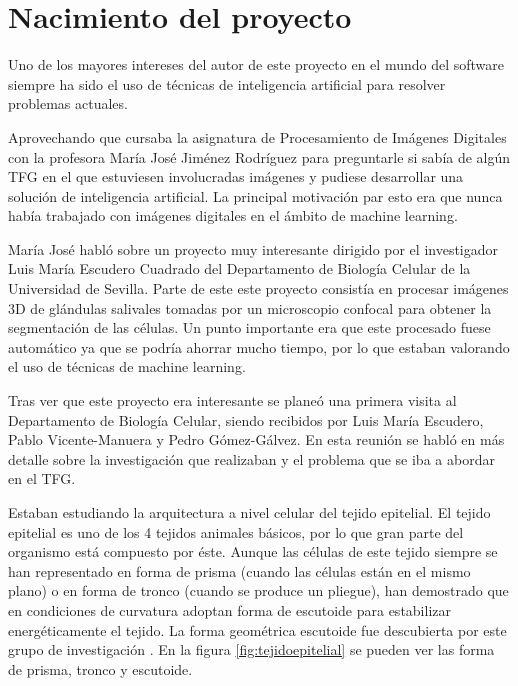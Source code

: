 \chapter{Nacimiento del proyecto}\label{nacimiento}

Uno de los mayores intereses del autor de este proyecto en el mundo del software siempre ha sido el uso de técnicas de inteligencia artificial para resolver problemas actuales.

Aprovechando que cursaba la asignatura de Procesamiento de Imágenes Digitales con la profesora María José Jiménez Rodríguez para preguntarle si sabía de algún TFG en el que estuviesen involucradas imágenes y pudiese desarrollar una solución de inteligencia artificial. La principal motivación par esto era que nunca había trabajado con imágenes digitales en el ámbito de machine learning.

María José habló sobre un proyecto muy interesante dirigido por el investigador Luis María Escudero Cuadrado del Departamento de Biología Celular de la Universidad de Sevilla. Parte de este este proyecto consistía en procesar imágenes 3D de glándulas salivales tomadas por un microscopio confocal para obtener la segmentación de las células. Un punto importante era que este procesado fuese automático ya que se podría ahorrar mucho tiempo, por lo que estaban valorando el uso de técnicas de machine learning.

Tras ver que este proyecto era interesante se planeó una primera visita al Departamento de Biología Celular, siendo recibidos por Luis María Escudero, Pablo Vicente-Manuera y Pedro Gómez-Gálvez. En esta reunión se habló en más detalle sobre la investigación que realizaban y el problema que se iba a abordar en el TFG.

Estaban estudiando la arquitectura a nivel celular del tejido epitelial. El tejido epitelial es uno de los 4 tejidos animales básicos, por lo que gran parte del organismo está compuesto por éste. Aunque las células de este tejido siempre se han representado en forma de prisma (cuando las células están en el mismo plano) o en forma de tronco (cuando se produce un pliegue), han demostrado que en condiciones de curvatura adoptan forma de escutoide para estabilizar energéticamente el tejido. La forma geométrica escutoide fue descubierta por este grupo de investigación \cite{GomezGalvez2018}. En la figura \ref{fig:tejidoepitelial} se pueden ver las forma de prisma, tronco y escutoide.


